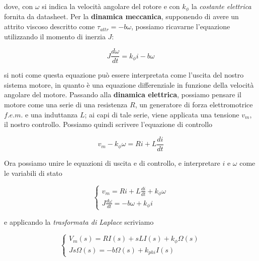 		\noindent dove, con $\omega$ si indica la velocità angolare del rotore e con $k_{\phi}$ la \textit{costante elettrica} fornita da datasheet.\newline
		Per la \textbf{dinamica meccanica}, supponendo di avere un attrito viscoso descritto come $\tau_{attr} = -b\omega$, possiamo ricavarne l'equazione utilizzando il momento di inerzia $J$:
	
		\begin{equation}
			J\frac{d\omega}{dt} = k_{\phi}i - b\omega
			\label{eq:uscita}
		\end{equation}  
	
		\noindent si noti come questa equazione può essere interpretata come l'uscita del nostro sistema motore, in quanto è una equazione differenziale in funzione della velocità angolare del motore. \newline
		Passando alla \textbf{dinamica elettrica}, possiamo pensare il motore come una serie di una resistenza $R$, un generatore di forza elettromotrice $f.e.m.$ e una induttanza $L$; ai capi di tale serie, viene applicata una tensione $v_m$, il nostro controllo. Possiamo quindi scrivere l'equazione di controllo
	
		\begin{equation}
			v_m -k_{\phi}\omega = Ri + L \frac{di}{dt}
			\label{eq:controllo}
		\end{equation}    
	
		\noindent Ora possiamo unire le equazioni di uscita e di controllo, e interpretare $i$ e $\omega$ come le variabili di stato
	
		\begin{equation}
			\begin{cases}
				v_m = Ri + L\frac{di}{dt} + k_{\phi}\omega \\
				J\frac{d\omega}{dt} = -b\omega + k_{\phi}i
			\end{cases}
			\label{eq:dinamicaComplessiva}
		\end{equation}
	
		\noindent e applicando la \textit{trasformata di Laplace} scriviamo
	
		\begin{equation}
			\begin{cases}
				V_m(s) = RI(s) +sLI(s) + k_{\phi}\Omega(s)\\
				Js\Omega(s) = -b\Omega(s) + k_{phi}I(s)	
			\end{cases}
			\label{eq:dinamecaComplessivaLaplace}
		\end{equation}
	
